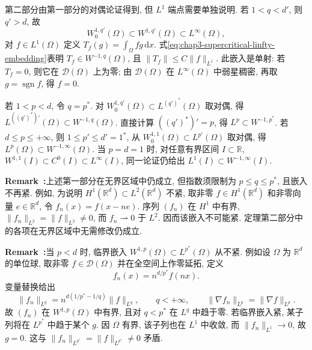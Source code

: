 \begin{Proof}
第二部分由第一部分的对偶论证得到, 但 $L^1$ 端点需要单独说明. 若 $1<q<d'$, 则 $q'>d$, 故
\begin{equation}
 W_0^{1,q'}(\Omega)\subset W^{1,q'}(\Omega)\subset L^\infty(\Omega),
 \label{eq:chap3-supercritical-linfty-embedding}
\end{equation}
对 $f\in L^1(\Omega)$ 定义 $T_f(g)=\int_\Omega fg\,\mathrm dx$. 式\eqref{eq:chap3-supercritical-linfty-embedding}表明 $T_f\in W^{-1,q}(\Omega)$, 且 $\|T_f\|\leq C\|f\|_{L^1}$. 此嵌入是单射: 若 $T_f=0$, 则它在 $\mathcal D(\Omega)$ 上为零; 由 $\mathcal D(\Omega)$ 在 $L^\infty(\Omega)$ 中弱星稠密, 再取 $g=\operatorname{sgn}f$, 得 $f=0$.

若 $1<p<d$, 令 $q=p^*$. 对 $W_0^{1,q'}(\Omega)\subset L^{(q')^*}(\Omega)$ 取对偶, 得 $L^{((q')^*)'}(\Omega)\subset W^{-1,q}(\Omega)$. 直接计算 $((q')^*)'=p$, 得 $L^p\subset W^{-1,p^*}$. 若 $d\leq p\leq+\infty$, 则 $1\leq p'\leq d'=1^*$, 从 $W_0^{1,1}(\Omega)\subset L^{p'}(\Omega)$ 取对偶, 得 $L^p(\Omega)\subset W^{-1,\infty}(\Omega)$. 当 $p=d=1$ 时, 对任意有界区间 $I\subset\mathbb R$, $W^{1,1}(I)\subset C^0(I)\subset L^\infty(I)$, 同一论证仍给出 $L^1(I)\subset W^{-1,\infty}(I)$.
\end{Proof}

\par\noindent{}\textbf{Remark~\thechapterthreesectiontworemark:}\label{rem:chap3-unbounded-sobolev-embeddings}\quad 上述第一部分在无界区域中仍成立, 但指数须限制为 $p\leq q\leq p^*$, 且嵌入不再紧. 例如, 为说明 $H^1(\mathbb R^d)\subset L^2(\mathbb R^d)$ 不紧, 取非零 $f\in H^1(\mathbb R^d)$ 和非零向量 $e\in\mathbb R^d$, 令 $f_n(x)=f(x-ne)$. 序列 $(f_n)$ 在 $H^1$ 中有界, $\|f_n\|_{L^2}=\|f\|_{L^2}\neq0$, 而 $f_n\rightharpoonup0$ 于 $L^2$. 因而该嵌入不可能紧. 定理第二部分中的各项在无界区域中无需修改仍成立.

\par\noindent{}\textbf{Remark~\thechapterthreesectiontworemark:}\label{rem:chap3-critical-embedding-noncompact}\quad 当 $p<d$ 时, 临界嵌入 $W^{1,p}(\Omega)\subset L^{p^*}(\Omega)$ 从不紧. 例如设 $\Omega$ 为 $\mathbb R^d$ 的单位球, 取非零 $f\in\mathcal D(\Omega)$ 并在全空间上作零延拓, 定义
\[
 f_n(x)=n^{d/p^*}f(nx).
\]
变量替换给出
\[
 \|f_n\|_{L^q}=n^{d(1/p^*-1/q)}\|f\|_{L^q},
 \qquad q<+\infty,
 \qquad\|\nabla f_n\|_{L^p}=\|\nabla f\|_{L^p}.
\]
故 $(f_n)$ 在 $W^{1,p}(\Omega)$ 中有界, 且对 $q<p^*$ 在 $L^q$ 中趋于零. 若临界嵌入紧, 某子列将在 $L^{p^*}$ 中趋于某个 $g$. 因 $\Omega$ 有界, 该子列也在 $L^1$ 中收敛, 而 $\|f_n\|_{L^1}\to0$, 故 $g=0$. 这与 $\|f_n\|_{L^{p^*}}=\|f\|_{L^{p^*}}\neq0$ 矛盾.

